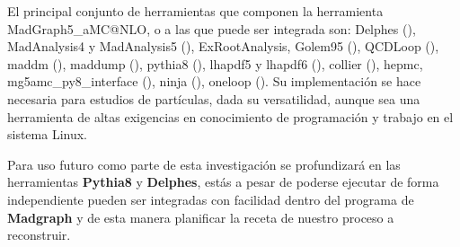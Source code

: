 El principal conjunto de herramientas que componen la herramienta Mad\-Graph5\_\-a\-MC\-@NLO, o a las que puede ser integrada son: Delphes (\cite{de_favereau_delphes_2014-1}), MadAnalysis4 y MadAnalysis5 (\cite{conte_madanalysis_2013}), ExRootAnalysis, Golem95 (\cite{binoth_precise_2008}), QCDLoop (\cite{ellis_scalar_2008}), maddm (\cite{wang_novel_2018}), maddump (\cite{buonocore_event_2019}), pythia8 (\cite{sjostrand_introduction_2015-1}), lhapdf5 y lhapdf6 (\cite{buckley_lhapdf6_2015}), collier (\cite{denner_collier_2017}), hepmc, mg5amc\_py8\_interface (\cite{sjostrand_introduction_2015-1}), ninja (\cite{hirschi_tensor_2016, peraro_ninja_2014, mastrolia_integrand_2012}), oneloop (\cite{van_hameren_oneloop_2011}). Su implementación se hace necesaria para estudios de partículas, dada su versatilidad, aunque sea una herramienta de altas exigencias en conocimiento de programación y trabajo en el sistema Linux. 

Para uso futuro como parte de esta investigación se profundizará en las herramientas \textbf{Pythia8} y \textbf{Delphes}, estás a pesar de poderse ejecutar de forma independiente pueden ser integradas con facilidad dentro del programa de \textbf{Madgraph} y de esta manera planificar la receta de nuestro proceso a reconstruir.
